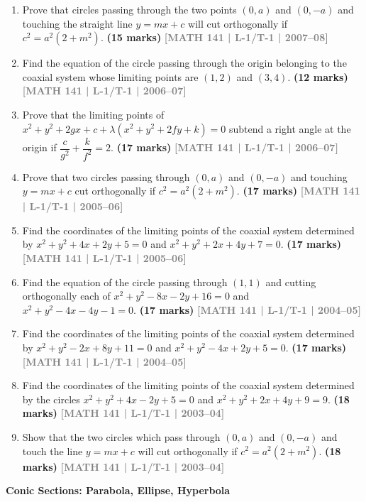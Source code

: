 \documentclass[12pt,a4paper]{article}
\newcommand{\yr}[1]{\hfill\textcolor{gray}{\small\textbf{[#1]}}}
\newcommand{\mk}[1]{\textcolor{orange!70!black}{\small\textbf{(#1 marks)}}}
\newcommand{\subtopic}[2]{%
  \vspace{10pt}
  \noindent\begin{tcolorbox}[colback=#1!8,colframe=#1,boxrule=0.6pt,arc=4pt,
    left=6pt,right=6pt,top=4pt,bottom=4pt]
    \small\bfseries\textcolor{#1}{#2}
  \end{tcolorbox}
  \vspace{2pt}
}
\begin{document}
\begin{enumerate}
\item Prove that circles passing through the two points $(0,a)$ and $(0,-a)$ and touching the straight line $y=mx+c$ will cut orthogonally if $c^{2}=a^{2}(2+m^{2})$.
\mk{15} \yr{MATH 141 | L-1/T-1 | 2007--08}

\item Find the equation of the circle passing through the origin belonging to the coaxial system whose limiting points are $(1,2)$ and $(3,4)$.
\mk{12} \yr{MATH 141 | L-1/T-1 | 2006--07}

\item Prove that the limiting points of $x^{2}+y^{2}+2gx+c+\lambda(x^{2}+y^{2}+2fy+k)=0$ subtend a right angle at the origin if $\dfrac{c}{g^{2}}+\dfrac{k}{f^{2}}=2$.
\mk{17} \yr{MATH 141 | L-1/T-1 | 2006--07}

\item Prove that two circles passing through $(0,a)$ and $(0,-a)$ and touching $y=mx+c$ cut orthogonally if $c^{2}=a^{2}(2+m^{2})$.
\mk{17} \yr{MATH 141 | L-1/T-1 | 2005--06}

\item Find the coordinates of the limiting points of the coaxial system determined by $x^{2}+y^{2}+4x+2y+5=0$ and $x^{2}+y^{2}+2x+4y+7=0$.
\mk{17} \yr{MATH 141 | L-1/T-1 | 2005--06}

\item Find the equation of the circle passing through $(1,1)$ and cutting orthogonally each of $x^{2}+y^{2}-8x-2y+16=0$ and $x^{2}+y^{2}-4x-4y-1=0$.
\mk{17} \yr{MATH 141 | L-1/T-1 | 2004--05}

\item Find the coordinates of the limiting points of the coaxial system determined by $x^{2}+y^{2}-2x+8y+11=0$ and $x^{2}+y^{2}-4x+2y+5=0$.
\mk{17} \yr{MATH 141 | L-1/T-1 | 2004--05}

\item Find the coordinates of the limiting points of the coaxial system determined by the circles $x^{2}+y^{2}+4x-2y+5=0$ and $x^{2}+y^{2}+2x+4y+9=9$.
\mk{18} \yr{MATH 141 | L-1/T-1 | 2003--04}

\item Show that the two circles which pass through $(0,a)$ and $(0,-a)$ and touch the line $y=mx+c$ will cut orthogonally if $c^{2}=a^{2}(2+m^{2})$.
\mk{18} \yr{MATH 141 | L-1/T-1 | 2003--04}

\end{enumerate}

\subtopic{cH}{Conic Sections: Parabola, Ellipse, Hyperbola}
\label{sub:s10-conics}
\end{document}
